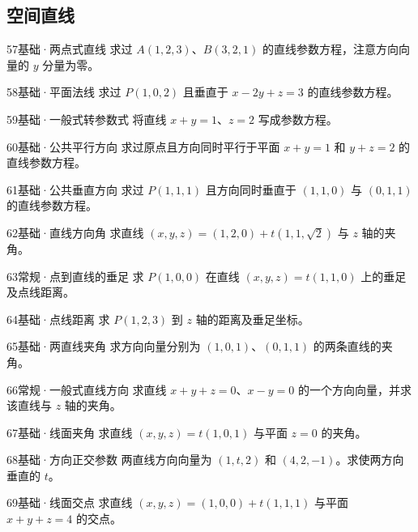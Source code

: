 \subsection{空间直线}
\begin{exercise}{57}{基础·两点式直线}
求过 $A(1,2,3)$、$B(3,2,1)$ 的直线参数方程，注意方向向量的 $y$ 分量为零。
\end{exercise}
\begin{exercise}{58}{基础·平面法线}
求过 $P(1,0,2)$ 且垂直于 $x-2y+z=3$ 的直线参数方程。
\end{exercise}
\begin{exercise}{59}{基础·一般式转参数式}
将直线 $x+y=1$、$z=2$ 写成参数方程。
\end{exercise}
\begin{exercise}{60}{基础·公共平行方向}
求过原点且方向同时平行于平面 $x+y=1$ 和 $y+z=2$ 的直线参数方程。
\end{exercise}
\begin{exercise}{61}{基础·公共垂直方向}
求过 $P(1,1,1)$ 且方向同时垂直于 $(1,1,0)$ 与 $(0,1,1)$ 的直线参数方程。
\end{exercise}
\begin{exercise}{62}{基础·直线方向角}
求直线 $(x,y,z)=(1,2,0)+t(1,1,\sqrt2)$ 与 $z$ 轴的夹角。
\end{exercise}
\begin{exercise}{63}{常规·点到直线的垂足}
求 $P(1,0,0)$ 在直线 $(x,y,z)=t(1,1,0)$ 上的垂足及点线距离。
\end{exercise}
\begin{exercise}{64}{基础·点线距离}
求 $P(1,2,3)$ 到 $z$ 轴的距离及垂足坐标。
\end{exercise}
\begin{exercise}{65}{基础·两直线夹角}
求方向向量分别为 $(1,0,1)$、$(0,1,1)$ 的两条直线的夹角。
\end{exercise}
\begin{exercise}{66}{常规·一般式直线方向}
求直线 $x+y+z=0$、$x-y=0$ 的一个方向向量，并求该直线与 $z$ 轴的夹角。
\end{exercise}
\begin{exercise}{67}{基础·线面夹角}
求直线 $(x,y,z)=t(1,0,1)$ 与平面 $z=0$ 的夹角。
\end{exercise}
\begin{exercise}{68}{基础·方向正交参数}
两直线方向向量为 $(1,t,2)$ 和 $(4,2,-1)$。求使两方向垂直的 $t$。
\end{exercise}
\begin{exercise}{69}{基础·线面交点}
求直线 $(x,y,z)=(1,0,0)+t(1,1,1)$ 与平面 $x+y+z=4$ 的交点。
\end{exercise}
